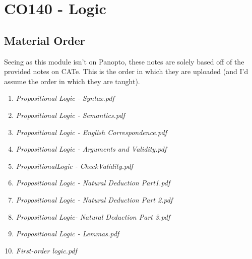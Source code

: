 \documentclass[a4paper, 12pt]{article}
\begin{document}
        \section*{CO140 - Logic}
        \subsection*{Material Order}
        Seeing as this module isn't on Panopto, these notes are solely based off of the provided notes on CATe. This is the order in which they are uploaded (and I'd assume the order in which they are taught).
        \begin{enumerate}[1.]
            \item \textit{Propositional Logic - Syntax.pdf}
            \item \textit{Propositional Logic - Semantics.pdf}
            \item \textit{Propositional Logic - English Correspondence.pdf}
            \item \textit{Propositional Logic - Arguments and Validity.pdf}
            \item \textit{PropositionalLogic - CheckValidity.pdf}
            \item \textit{Propositional Logic - Natural Deduction Part1.pdf}
            \item \textit{Propositional Logic - Natural Deduction Part 2.pdf}
            \item \textit{Propositional Logic- Natural Deduction Part 3.pdf}
            \item \textit{Propositional Logic - Lemmas.pdf}
            \item \textit{First-order logic.pdf}
        \end{enumerate}
\end{document}
